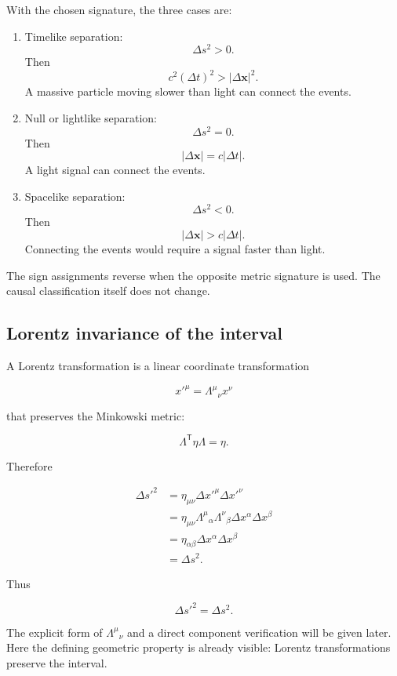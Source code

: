 With the chosen signature, the three cases are:

\begin{enumerate}
    \item Timelike separation:
    \[
    \boxed{\Delta s^{2}>0}.
    \]
    Then
    \[
    c^{2}(\Delta t)^{2}>|\Delta\mathbf{x}|^{2}.
    \]
    A massive particle moving slower than light can connect the events.

    \item Null or lightlike separation:
    \[
    \boxed{\Delta s^{2}=0}.
    \]
    Then
    \[
    |\Delta\mathbf{x}|=c|\Delta t|.
    \]
    A light signal can connect the events.

    \item Spacelike separation:
    \[
    \boxed{\Delta s^{2}<0}.
    \]
    Then
    \[
    |\Delta\mathbf{x}|>c|\Delta t|.
    \]
    Connecting the events would require a signal faster than light.
\end{enumerate}

The sign assignments reverse when the opposite metric signature is used. The causal classification itself does not change.

\subsection{Lorentz invariance of the interval}

A Lorentz transformation is a linear coordinate transformation

\[
x'^{\mu}
=
\Lambda^{\mu}{}_{\nu}x^{\nu}
\]

that preserves the Minkowski metric:

\[
\boxed{
\Lambda^{\mathsf{T}}\eta\Lambda
=
\eta
}.
\]

Therefore

\[
\begin{aligned}
\Delta s'^{2}
&=
\eta_{\mu\nu}
\Delta x'^{\mu}
\Delta x'^{\nu}\\
&=
\eta_{\mu\nu}
\Lambda^{\mu}{}_{\alpha}
\Lambda^{\nu}{}_{\beta}
\Delta x^{\alpha}
\Delta x^{\beta}\\
&=
\eta_{\alpha\beta}
\Delta x^{\alpha}
\Delta x^{\beta}\\
&=
\Delta s^{2}.
\end{aligned}
\]

Thus

\[
\boxed{
\Delta s'^{2}=\Delta s^{2}
}.
\]

The explicit form of \(\Lambda^{\mu}{}_{\nu}\) and a direct component verification will be given later. Here the defining geometric property is already visible: Lorentz transformations preserve the interval.

